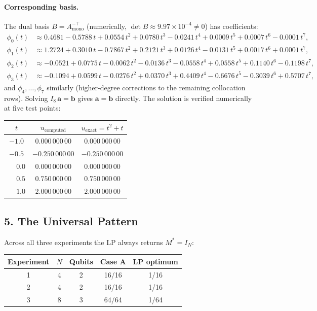 \documentclass{article}
\begin{document}
\paragraph{Corresponding basis.}
The dual basis $B = A_{\mathrm{mono}}^{-\top}$ (numerically, $\det B \approx
9.97\times 10^{-4} \neq 0$) has coefficients:
\begin{align*}
\phi_0(t) &\approx 0.4681 - 0.5788\,t + 0.0554\,t^2 + 0.0780\,t^3
            - 0.0241\,t^4 + 0.0009\,t^5 + 0.0007\,t^6 - 0.0001\,t^7,\\
\phi_1(t) &\approx 1.2724 + 0.3010\,t - 0.7867\,t^2 + 0.2121\,t^3
            + 0.0126\,t^4 - 0.0131\,t^5 + 0.0017\,t^6 + 0.0001\,t^7,\\
\phi_2(t) &\approx -0.0521 + 0.0775\,t - 0.0062\,t^2 - 0.0136\,t^3
            - 0.0558\,t^4 + 0.0558\,t^5 + 0.1140\,t^6 - 0.1198\,t^7,\\
\phi_3(t) &\approx -0.1094 + 0.0599\,t - 0.0276\,t^2 + 0.0370\,t^3
            + 0.4409\,t^4 - 0.6676\,t^5 - 0.3039\,t^6 + 0.5707\,t^7,
\end{align*}
and $\phi_4,\ldots,\phi_7$ similarly (higher-degree corrections to the remaining
collocation rows).  Solving $I_8\,\mathbf{a}=\mathbf{b}$ gives $\mathbf{a}=\mathbf{b}$
directly.  The solution is verified numerically at five test points:

\begin{center}
\begin{tabular}{ccc}
\toprule
$t$ & $u_{\mathrm{computed}}$ & $u_{\mathrm{exact}} = t^2+t$ \\
\midrule
$-1.0$ & $0.000\,000\,00$ & $0.000\,000\,00$ \\
$-0.5$ & $-0.250\,000\,00$ & $-0.250\,000\,00$ \\
$\phantom{-}0.0$ & $0.000\,000\,00$ & $0.000\,000\,00$ \\
$\phantom{-}0.5$ & $0.750\,000\,00$ & $0.750\,000\,00$ \\
$\phantom{-}1.0$ & $2.000\,000\,00$ & $2.000\,000\,00$ \\
\bottomrule
\end{tabular}
\end{center}

\subsection*{5. The Universal Pattern}

Across all three experiments the LP always returns $M^* = I_N$:

\begin{center}
\begin{tabular}{ccccc}
\toprule
Experiment & $N$ & Qubits & Case A & LP optimum \\
\midrule
1 & 4 & 2 & 16/16 & 1/16 \\
2 & 4 & 2 & 16/16 & 1/16 \\
3 & 8 & 3 & 64/64 & 1/64 \\
\bottomrule
\end{tabular}
\end{center}
\end{document}
